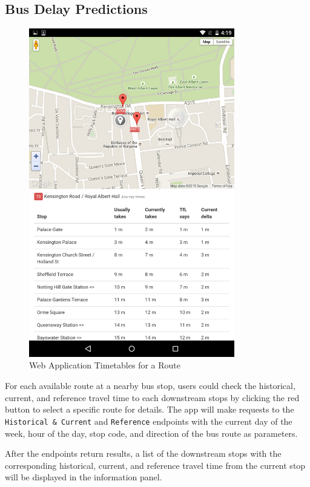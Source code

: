 \subsection{Bus Delay Predictions}
\begin{figure}
\centering
\includegraphics[width=0.8\textwidth]{figures/timetables.png}
\caption{\label{fig:timetable_view} Web Application Timetables for a Route}
\end{figure}

\par For each available route at a nearby bus stop, users could check the historical, current, and reference travel time to each downstream stops by clicking the red button to select a specific route for details. The app will make requests to the \texttt{Historical \& Current} and \texttt{Reference} endpoints with the current day of the week, hour of the day, stop code, and direction of the bus route as parameters.


\par After the endpoints return results, a list of the downstream stops with the corresponding historical, current, and reference travel time from the current stop will be displayed in the information panel.

